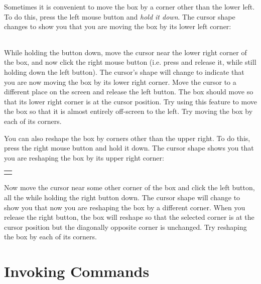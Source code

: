 \documentclass[letterpaper,twoside,12pt]{article}
\begin{document}
Sometimes it is convenient to move the box by a corner other
than the lower left.  To do this, press the left mouse button
and {\itshape hold it down}.  The cursor shape changes to show you
that you are moving the box by its lower left corner:

\begin{center}
   \begin{tabular}{|c|} \hline
	\hspace*{0.1in} \\ \hline
   \end{tabular}
\end{center}

While
holding the button down, move the cursor near the lower right
corner of the box, and now click the right mouse button (i.e.
press and release it, while still holding down the left
button).  The cursor's shape will change to indicate that
you are now moving the box by its lower right corner.  Move
the cursor to a different place on the screen and release
the left button.  The box should move so that its lower right
corner is at the cursor position.  Try using this feature to
move the box so that it is almost entirely off-screen to the
left.  Try moving the box by each of its corners.

You can also reshape the box by corners other than the upper
right.  To do this, press the right mouse button and hold
it down.  The cursor shape shows you that you are reshaping
the box by its upper right corner:

\begin{center}
   \begin{tabular}{c|} \hline
	\hspace*{0.1in} \\
   \end{tabular}
\end{center}

Now move the cursor
near some other corner of the box and click the left button,
all the while holding the right button down.  The cursor
shape will change to show you that now you are reshaping the
box by a different corner.  When you release the right button,
the box will reshape so that the selected corner is at
the cursor position but the diagonally opposite corner is unchanged.
Try reshaping the box by each of its corners.

\section{Invoking Commands}
\end{document}
